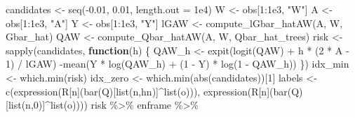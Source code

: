 \documentclass[
  11pt,
  openright,twoside]{book}
\newenvironment{Shaded}{\begin{snugshade}}{\end{snugshade}}
\newcommand{\AttributeTok}[1]{\textcolor[rgb]{0.77,0.63,0.00}{#1}}
\newcommand{\ControlFlowTok}[1]{\textcolor[rgb]{0.13,0.29,0.53}{\textbf{#1}}}
\newcommand{\DecValTok}[1]{\textcolor[rgb]{0.00,0.00,0.81}{#1}}
\newcommand{\FloatTok}[1]{\textcolor[rgb]{0.00,0.00,0.81}{#1}}
\newcommand{\FunctionTok}[1]{\textcolor[rgb]{0.00,0.00,0.00}{#1}}
\newcommand{\NormalTok}[1]{#1}
\newcommand{\OtherTok}[1]{\textcolor[rgb]{0.56,0.35,0.01}{#1}}
\newcommand{\SpecialCharTok}[1]{\textcolor[rgb]{0.00,0.00,0.00}{#1}}
\newcommand{\StringTok}[1]{\textcolor[rgb]{0.31,0.60,0.02}{#1}}
\theoremstyle{definition}
\theoremstyle{definition}
\theoremstyle{definition}
\theoremstyle{definition}
\theoremstyle{remark}
\begin{document}
\begin{Shaded}
\begin{Highlighting}[]
\NormalTok{candidates }\OtherTok{\textless{}{-}} \FunctionTok{seq}\NormalTok{(}\SpecialCharTok{{-}}\FloatTok{0.01}\NormalTok{, }\FloatTok{0.01}\NormalTok{, }\AttributeTok{length.out =} \FloatTok{1e4}\NormalTok{)}
\NormalTok{W }\OtherTok{\textless{}{-}}\NormalTok{ obs[}\DecValTok{1}\SpecialCharTok{:}\FloatTok{1e3}\NormalTok{, }\StringTok{"W"}\NormalTok{]}
\NormalTok{A }\OtherTok{\textless{}{-}}\NormalTok{ obs[}\DecValTok{1}\SpecialCharTok{:}\FloatTok{1e3}\NormalTok{, }\StringTok{"A"}\NormalTok{]}
\NormalTok{Y }\OtherTok{\textless{}{-}}\NormalTok{ obs[}\DecValTok{1}\SpecialCharTok{:}\FloatTok{1e3}\NormalTok{, }\StringTok{"Y"}\NormalTok{]}
\NormalTok{lGAW }\OtherTok{\textless{}{-}} \FunctionTok{compute\_lGbar\_hatAW}\NormalTok{(A, W, Gbar\_hat)}
\NormalTok{QAW }\OtherTok{\textless{}{-}} \FunctionTok{compute\_Qbar\_hatAW}\NormalTok{(A, W, Qbar\_hat\_trees)}
\NormalTok{risk }\OtherTok{\textless{}{-}} \FunctionTok{sapply}\NormalTok{(candidates,}
               \ControlFlowTok{function}\NormalTok{(h) \{}
\NormalTok{                 QAW\_h }\OtherTok{\textless{}{-}} \FunctionTok{expit}\NormalTok{(}\FunctionTok{logit}\NormalTok{(QAW)  }\SpecialCharTok{+}\NormalTok{ h }\SpecialCharTok{*}\NormalTok{ (}\DecValTok{2} \SpecialCharTok{*}\NormalTok{ A }\SpecialCharTok{{-}} \DecValTok{1}\NormalTok{) }\SpecialCharTok{/}\NormalTok{ lGAW)}
                 \SpecialCharTok{{-}}\FunctionTok{mean}\NormalTok{(Y }\SpecialCharTok{*} \FunctionTok{log}\NormalTok{(QAW\_h) }\SpecialCharTok{+}\NormalTok{ (}\DecValTok{1} \SpecialCharTok{{-}}\NormalTok{ Y) }\SpecialCharTok{*} \FunctionTok{log}\NormalTok{(}\DecValTok{1} \SpecialCharTok{{-}}\NormalTok{ QAW\_h))}
\NormalTok{               \})}
\NormalTok{idx\_min }\OtherTok{\textless{}{-}} \FunctionTok{which.min}\NormalTok{(risk)}
\NormalTok{idx\_zero }\OtherTok{\textless{}{-}} \FunctionTok{which.min}\NormalTok{(}\FunctionTok{abs}\NormalTok{(candidates))[}\DecValTok{1}\NormalTok{]}
\NormalTok{labels }\OtherTok{\textless{}{-}} \FunctionTok{c}\NormalTok{(}\FunctionTok{expression}\NormalTok{(R[n](}\FunctionTok{bar}\NormalTok{(Q)[}\FunctionTok{list}\NormalTok{(n,hn)]}\SpecialCharTok{\^{}}\FunctionTok{list}\NormalTok{(o))),}
            \FunctionTok{expression}\NormalTok{(R[n](}\FunctionTok{bar}\NormalTok{(Q)[}\FunctionTok{list}\NormalTok{(n,}\DecValTok{0}\NormalTok{)]}\SpecialCharTok{\^{}}\FunctionTok{list}\NormalTok{(o))))}
\NormalTok{risk }\SpecialCharTok{\%\textgreater{}\%}\NormalTok{ enframe }\SpecialCharTok{\%\textgreater{}\%}

\end{Highlighting}
\end{Shaded}
\end{document}
